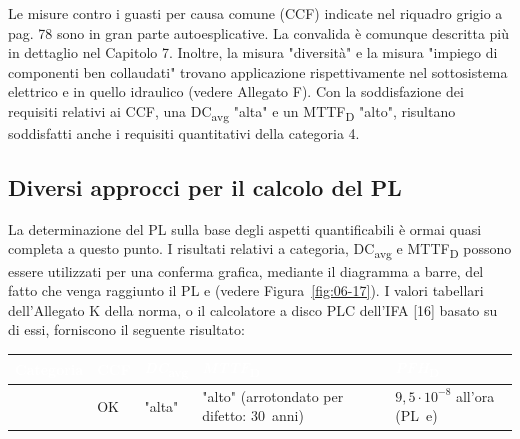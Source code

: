 Le misure contro i guasti per causa comune (CCF) indicate nel riquadro grigio a pag. 78 sono in gran parte autoesplicative. La convalida è comunque descritta più in dettaglio nel Capitolo 7. Inoltre, la misura "diversità" e la misura "impiego di componenti ben collaudati" trovano applicazione rispettivamente nel sottosistema elettrico e in quello idraulico (vedere Allegato F). Con la soddisfazione dei requisiti relativi ai CCF, una DC\textsubscript{avg} "alta" e un MTTF\textsubscript{D} "alto", risultano soddisfatti anche i requisiti quantitativi della categoria 4.

\subsection{Diversi approcci per il calcolo del PL}
\label{subsec:06-5-6}
La determinazione del PL sulla base degli aspetti quantificabili è ormai quasi completa a questo punto. I risultati relativi a categoria, DC\textsubscript{avg} e MTTF\textsubscript{D} possono essere utilizzati per una conferma grafica, mediante il diagramma a barre, del fatto che venga raggiunto il PL e (vedere Figura~\ref{fig:06-17}). I valori tabellari dell'Allegato K della norma, o il calcolatore a disco PLC dell'IFA [16] basato su di essi, forniscono il seguente risultato:
\begin{center}
    \begin{minipage}{\textwidth}
    \captionsetup{hypcap=false}
    \centering
    \setlength{\tabcolsep}{4pt}
    \renewcommand{\arraystretch}{1.25}
    \label{tab:06-9}

    \begin{tabular}{%
        |>{\centering\arraybackslash}p{2.1cm}%
        |>{\centering\arraybackslash}p{1.4cm}%
        |>{\centering\arraybackslash}p{2.0cm}%
        |>{\centering\arraybackslash}p{3.2cm}%
        |>{\centering\arraybackslash}p{4.4cm}|}
        \hline
        \rowcolor{tabblue}
        \textcolor{white}{\textbf{Categoria}} &
        \textcolor{white}{\textbf{CCF}} &
        \textcolor{white}{\textbf{\textit{DC}\textsubscript{avg}}} &
        \textcolor{white}{\textbf{\textit{MTTF}\textsubscript{D}}} &
        \textcolor{white}{\textbf{\textit{PFH}\textsubscript{D}}}
        \tabularnewline
        \hline
        4 & OK & "alta" &
        "alto" \newline (arrotondato per difetto: 30~anni) &
        \cellcolor{black!8} $9{,}5 \cdot 10^{-8}$ all'ora \newline (PL~e)
        \tabularnewline
        \hline
    \end{tabular}
    \end{minipage}
\end{center}

